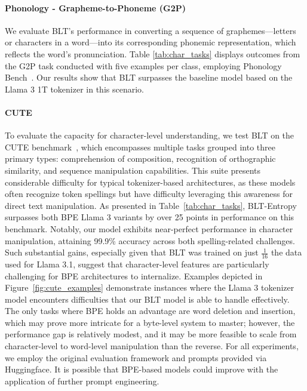 \paragraph{Phonology - Grapheme-to-Phoneme (G2P)} We evaluate {\textsc BLT}'s performance in converting a sequence of graphemes—letters or characters in a word—into its corresponding phonemic representation, which reflects the word's pronunciation. Table \ref{tab:char_tasks} displays outcomes from the G2P task conducted with five examples per class, employing Phonology Bench~\citep{suvarna2024phonologybench}. Our results show that {\textsc BLT} surpasses the baseline model based on the Llama 3 1T tokenizer in this scenario.

\paragraph{CUTE}
To evaluate the capacity for character-level understanding, we test {\textsc BLT} on the CUTE benchmark~\citep{edman2024cute}, which encompasses multiple tasks grouped into three primary types: comprehension of composition, recognition of orthographic similarity, and sequence manipulation capabilities. This suite presents considerable difficulty for typical tokenizer-based architectures, as these models often recognize token spellings but have difficulty leveraging this awareness for direct text manipulation. As presented in Table~\ref{tab:char_tasks}, {\textsc BLT}-Entropy surpasses both BPE Llama 3 variants by over 25 points in performance on this benchmark. Notably, our model exhibits near-perfect performance in character manipulation, attaining 99.9\% accuracy across both spelling-related challenges. Such substantial gains, especially given that {\textsc BLT} was trained on just $\frac{1}{16}$ the data used for Llama 3.1, suggest that character-level features are particularly challenging for BPE architectures to internalize. Examples depicted in Figure~\ref{fig:cute_examples} demonstrate instances where the Llama 3 tokenizer model encounters difficulties that our {\textsc BLT} model is able to handle effectively. The only tasks where BPE holds an advantage are word deletion and insertion, which may prove more intricate for a byte-level system to master; however, the performance gap is relatively modest, and it may be more feasible to scale from character-level to word-level manipulation than the reverse. For all experiments, we employ the original evaluation framework and prompts provided via Huggingface. It is possible that BPE-based models could improve with the application of further prompt engineering.


